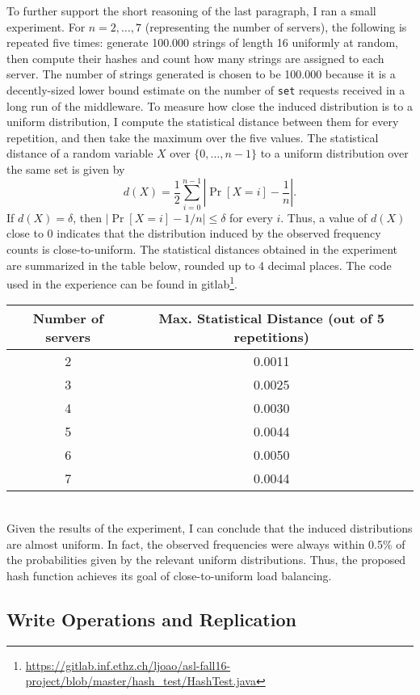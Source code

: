 \documentclass[11pt]{article}
\begin{document}
To further support the short reasoning of the last paragraph, I ran a small experiment. For $n=2,\dots, 7$ (representing the number of servers), the following is repeated five times: generate 100.000 strings of length 16 uniformly at random, then compute their hashes and count how many strings are assigned to each server. The number of strings generated is chosen to be 100.000 because it is a decently-sized lower bound estimate on the number of \texttt{set} requests received in a long run of the middleware. To measure how close the induced distribution is to a uniform distribution, I compute the statistical distance between them for every repetition, and then take the maximum over the five values. The statistical distance of a random variable $X$ over $\{0,\dots,n-1\}$ to a uniform distribution over the same set is given by
\[
	d(X)=\frac{1}{2}\sum_{i=0}^{n-1}\left|\Pr[X=i]-\frac{1}{n}\right|.
\]
If $d(X)=\delta$, then $|\Pr[X=i]-1/n|\leq \delta$ for every $i$. Thus, a value of $d(X)$ close to 0 indicates that the distribution induced by the observed frequency counts is close-to-uniform. The statistical distances obtained in the experiment are summarized in the table below, rounded up to 4 decimal places. The code used in the experience can be found in gitlab\footnote{\url{https://gitlab.inf.ethz.ch/ljoao/asl-fall16-project/blob/master/hash_test/HashTest.java}}.

\small{
	\smallskip
	\begin{tabular}{|c|c|}
		\hline Number of servers & Max. Statistical Distance (out of 5 repetitions) \\ 
		\hline 2 & 0.0011 \\ 
		\hline 3 & 0.0025 \\ 
		\hline 4 & 0.0030 \\
		\hline 5 & 0.0044 \\ 
		\hline 6 & 0.0050 \\ 
		\hline 7 & 0.0044 \\
		\hline
	\end{tabular} }\\

Given the results of the experiment, I can conclude that the induced distributions are almost uniform. In fact, the observed frequencies were always within 0.5\% of the probabilities given by the relevant uniform distributions. Thus, the proposed hash function achieves its goal of close-to-uniform load balancing.

\subsection{Write Operations and Replication}\label{sec:desc:writes}
\end{document}
